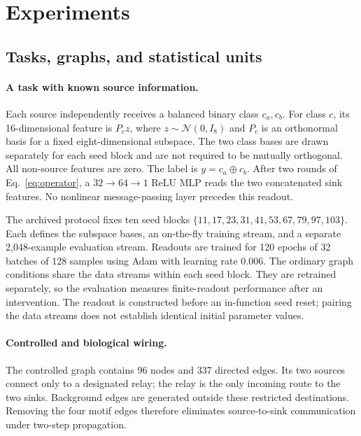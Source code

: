 \section{Experiments}
\label{sec:experiments}

\subsection{Tasks, graphs, and statistical units}
\label{sec:setup}

\paragraph{A task with known source information.}
Each source independently receives a balanced binary class $c_a,c_b$.
For class $c$, its 16-dimensional feature is $P_cz$, where
$z\sim\mathcal N(0,I_8)$ and $P_c$ is an orthonormal basis for a fixed
eight-dimensional subspace. The two class bases are drawn separately for
each seed block and are not required to be mutually orthogonal. All
non-source features are zero. The label is $y=c_a\oplus c_b$.
After two rounds of Eq.~\eqref{eq:operator}, a
$32\!\to\!64\!\to\!1$ ReLU MLP reads the two concatenated sink features.
No nonlinear message-passing layer precedes this readout.

The archived protocol fixes ten seed blocks
$\{11,17,23,31,41,53,67,79,97,103\}$. Each defines the subspace bases,
an on-the-fly training stream, and a separate 2,048-example evaluation
stream. Readouts are trained for 120 epochs of 32 batches of 128 samples
using Adam with learning rate 0.006. The ordinary graph conditions share
the data streams within each seed block. They are retrained separately,
so the evaluation measures finite-readout performance after an intervention.
The readout is constructed before an in-function seed reset; pairing the
data streams does not establish identical initial parameter values.

\paragraph{Controlled and biological wiring.}
The controlled graph contains 96 nodes and 337 directed edges. Its two
sources connect only to a designated relay; the relay is the only
incoming route to the two sinks. Background edges are generated outside
these restricted destinations. Removing the four motif edges therefore
eliminates source-to-sink communication under two-step propagation.

